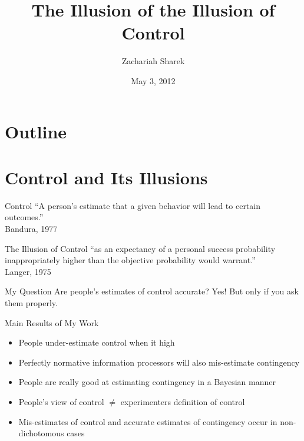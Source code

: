 \documentclass{beamer}
\author{Zachariah Sharek}
\title{The Illusion of the Illusion of Control}
\institute{Carnegie Mellon}
\date{May 3, 2012}
\begin{document}
\begin{frame}
	\titlepage
\end{frame}

\author{ }
\title{ }
\institute{ }
\date{ }


\section*{Outline}
\begin{frame}
	\tableofcontents
\end{frame}

\section{Control and Its Illusions}
\begin{frame}{Control}
	``A person's estimate that a given behavior will lead to certain outcomes.'' \\ 
	\textemdash Bandura, 1977\\
	\hyperlink{morecontroldefs}{}
\end{frame}

\begin{frame}{The Illusion of Control}
	``\textellipsis as an expectancy of a personal success probability inappropriately higher than the objective probability would warrant.'' \\
	\textemdash Langer, 1975
\end{frame}

\begin{frame}{My Question}
	Are people's estimates of control accurate?
	\pause
	Yes! But \textellipsis 
	\pause
	only if you ask them properly.
\end{frame}

\begin{frame}{Main Results of My Work}
	\begin{itemize}
	\pause
	\item People under-estimate control when it high
	\pause
	\item Perfectly normative information processors will also mis-estimate contingency
	\pause
	\item People are really good at estimating contingency in a Bayesian manner
	\pause
	\item People's view of control $\ne$ experimenters definition of control
	\pause
	\item Mis-estimates of control and accurate estimates of contingency occur in non-dichotomous cases
	\end{itemize}
\end{frame}
\end{document}
